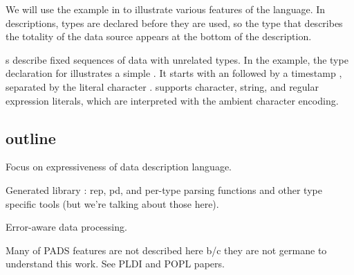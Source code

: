 We will use the example in  to illustrate
various features of the \pads{} language.  In \pads{} descriptions,
types are declared before they are used, so the type that describes
the totality of the data source appears at the bottom of the description.

s describe fixed sequences of data with unrelated types.
In the \dibbler{} example, the type declaration for 
illustrates a simple .  It starts with an
 followed by a timestamp , separated by
the literal character .
\pads{} supports character, string, and regular expression literals,
which are interpreted with the ambient character  encoding.

\subsection{outline}

Focus on expressiveness of data description language.

Generated library : rep, pd, and per-type parsing functions and other
type specific tools (but we're talking about those here). 

Error-aware data processing.  

Many of PADS features are not described here b/c they are not germane
to understand this work.  See PLDI and POPL papers. 
